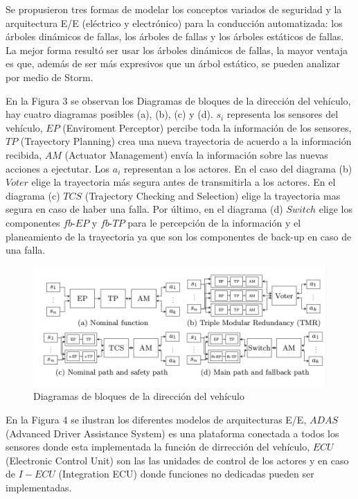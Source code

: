 \documentclass[11pt]{article}
\begin{document}
Se propusieron tres formas de modelar los conceptos variados de seguridad y la arquitectura E/E (el\'ectrico y electr\'onico) para la conducci\'on automatizada: los \'arboles din\'amicos de fallas, los \'arboles de fallas y los \'arboles est\'aticos de fallas. La mejor forma result\'o ser usar los \'arboles din\'amicos de fallas, la mayor ventaja es que, adem\'as de ser m\'as expresivos que un \'arbol est\'atico, se pueden analizar por medio de Storm.

En la Figura 3 se observan los Diagramas de bloques de la direcci\'on del veh\'iculo, hay cuatro diagramas posibles (a), (b), (c) y (d). $s_i$ representa los sensores del veh\'iculo, $EP$ (Enviroment Perceptor) percibe toda la informaci\'on de los sensores, $TP$ (Trayectory Planning) crea una nueva trayectoria de acuerdo a la informaci\'on recibida, $AM$ (Actuator Management) env\'ia la informaci\'on sobre las nuevas acciones a ejectutar. Los $a_i$ representan a los actores. En el caso del diagrama (b) $Voter$ elige la trayectoria m\'as segura antes de transmitirla a los actores. En el diagrama (c) $TCS$ (Trajectory Checking and Selection) elige la trayectoria mas segura en caso de haber una falla. Por \'ultimo, en el diagrama (d) $Switch$ elige los componentes $fb$-$EP$ y $fb$-$TP$ para le percepci\'on de la informaci\'on y el planeamiento de la trayectoria ya que son los componentes de back-up en caso de una falla.

\begin{figure}[h]
	\includegraphics[scale=0.43]{blockdiagram.png} 
	\centering
	\caption{Diagramas de bloques de la direcci\'on del veh\'iculo}
\end{figure}

En la Figura 4 se ilustran los diferentes modelos de arquitecturas E/E, $ADAS$ (Advanced Driver Assistance System) es una plataforma conectada a todos los sensores donde esta implementada la funci\'on de dirrecci\'on del veh\'iculo, $ECU$ (Electronic Control Unit) son las las unidades de control de los actores y en caso de $I-ECU$ (Integration ECU) donde funciones no dedicadas pueden ser implementadas.
\end{document}
